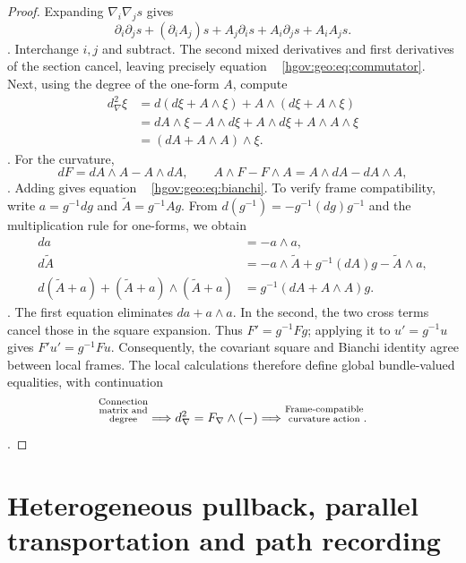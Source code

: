 \documentclass[12pt,a4paper,openany,notitlepage]{report}
\theoremstyle{plain}
\theoremstyle{definition}
\theoremstyle{remark}
\begin{document}
\begin{CJK*}
\begin{proof}
Expanding $\nabla_i\nabla_js$ gives
\[
\partial_i\partial_js+(\partial_iA_j)s
+A_j\partial_is+A_i\partial_js+A_iA_js.
\].
Interchange $i,j$ and subtract. The second mixed derivatives and first derivatives of the section cancel, leaving precisely equation ~ \eqref{hgov:geo:eq:commutator}. Next, using the degree of the one-form $A$, compute
\[
\begin{aligned}
d_\nabla^2\xi
&=d(d\xi+A\wedge\xi)+A\wedge(d\xi+A\wedge\xi)\\
&=dA\wedge\xi-A\wedge d\xi
+A\wedge d\xi+A\wedge A\wedge\xi\\
&=(dA+A\wedge A)\wedge\xi.
\end{aligned}
\].
For the curvature,
\[
dF=dA\wedge A-A\wedge dA,
\qquad
A\wedge F-F\wedge A=A\wedge dA-dA\wedge A,
\].
Adding gives equation ~ \eqref{hgov:geo:eq:bianchi}. To verify frame compatibility, write $a=g^{-1}dg$ and $\widetilde A=g^{-1}Ag$. From $d(g^{-1})=-g^{-1}(dg)g^{-1}$ and the multiplication rule for one-forms, we obtain
\[
\begin{aligned}
da&=-a\wedge a,\\
d\widetilde A&=-a\wedge\widetilde A+g^{-1}(dA)g-\widetilde A\wedge a,\\
d(\widetilde A+a)+(\widetilde A+a)\wedge(\widetilde A+a)
&=g^{-1}(dA+A\wedge A)g.
\end{aligned}
\].
The first equation eliminates $da+a\wedge a$. In the second, the two cross terms cancel those in the square expansion. Thus $F'=g^{-1}Fg$; applying it to $u'=g^{-1}u$ gives $F'u'=g^{-1}Fu$. Consequently, the covariant square and Bianchi identity agree between local frames. The local calculations therefore define global bundle-valued equalities, with continuation
\[
\text{\shortstack[c]{\scriptsize Connection\\[-1pt]\scriptsize matrix and\\[-1pt]\scriptsize degree}}
\Longrightarrow d_\nabla^2=F_\nabla\wedge(-)
\Longrightarrow\text{\shortstack[c]{\scriptsize Frame-compatible\\[-1pt]\scriptsize curvature action}}.
\].
\end{proof}

\section { Heterogeneous pullback, parallel transportation and path recording }\label{exp:geo:section:pullback}



\end{CJK*}
\end{document}
